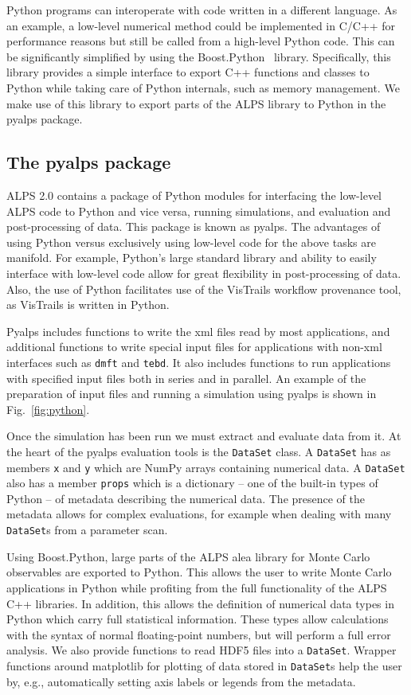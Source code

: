 \documentclass[12pt]{iopart}
\begin{document}
Python programs can interoperate with code written in a different language. As an example, a low-level numerical method could be implemented in C/C++ for performance reasons but still be called from a high-level Python code. This can be significantly simplified by using the Boost.Python~\cite{boost} library. Specifically, this library provides a simple interface to export C++ functions and classes to Python while taking care of Python internals, such as memory management. We make use of this library to export parts of the ALPS library to Python in the pyalps package.

\subsection{The pyalps package}
ALPS 2.0 contains a package of Python modules for interfacing the low-level ALPS code to Python and vice versa, running simulations, and evaluation and post-processing of data. This package is known as pyalps. The advantages of using Python versus exclusively using low-level code for the above tasks are manifold. For example, Python's large standard library and ability to easily interface with low-level code allow for great flexibility in post-processing of data. Also, the use of Python facilitates use of the VisTrails workflow provenance tool, as VisTrails is written in Python.

Pyalps includes functions to write the xml files read by most applications, and additional functions to write special input files for applications with non-xml interfaces such as {\tt dmft} and {\tt tebd}. It also includes functions to run applications with specified input files both in series and in parallel. An example of the preparation of input files and running a simulation using pyalps is shown in Fig.~\ref{fig:python}.

Once the simulation has been run we must extract and evaluate data from it. At the heart of the pyalps evaluation tools is the {\tt DataSet} class. A {\tt DataSet} has as members {\tt x} and {\tt y} which are NumPy arrays containing numerical data. A {\tt DataSet} also has a member {\tt props} which is a dictionary -- one of the built-in types of Python -- of metadata describing the numerical data. The presence of the metadata allows for complex evaluations, for example when dealing with many {\tt DataSet}s from a parameter scan.

Using Boost.Python, large parts of the ALPS alea library for Monte Carlo observables are exported to Python. This allows the user to write Monte Carlo applications in Python while profiting from the full functionality of the ALPS C++ libraries. In addition, this allows the definition of numerical data types in Python which carry full statistical information. These types allow calculations with the syntax of normal floating-point numbers, but will perform a full error analysis. We also provide functions to read HDF5 files into a {\tt DataSet}. Wrapper functions around matplotlib for plotting of data stored in {\tt DataSet}s help the user by, e.g., automatically setting axis labels or legends from the metadata.
\end{document}
